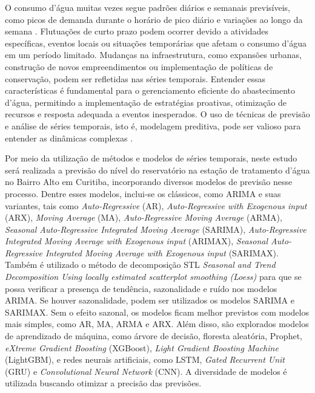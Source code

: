 O consumo d'água muitas vezes segue padrões diários e semanais previsíveis, como picos de demanda durante o horário de pico diário e variações ao longo da semana \cite{SIEGEL2020103481}. Flutuações de curto prazo podem ocorrer devido a atividades específicas, eventos locais ou situações temporárias que afetam o consumo d'água em um período limitado. Mudanças na infraestrutura, como expansões urbanas, construção de novos empreendimentos ou implementação de políticas de conservação, podem ser refletidas nas séries temporais. Entender essas características é fundamental para o gerenciamento eficiente do abastecimento d'água, permitindo a implementação de estratégias proativas, otimização de recursos e resposta adequada a eventos inesperados. O uso de técnicas de previsão e análise de séries temporais, isto é, modelagem preditiva, pode ser valioso para entender as dinâmicas complexas \cite{UCCASTILLO2023105788}.

Por meio da utilização de métodos e modelos de séries temporais, neste estudo será realizada a previsão do nível do reservatório na estação de tratamento d'água no Bairro Alto em Curitiba, incorporando diversos modelos de previsão nesse processo. Dentre esses modelos, inclui-se os clássicos, como ARIMA e suas variantes, tais como \textit{Auto-Regressive} (AR), \textit{Auto-Regressive with Exogenous input} (ARX), \textit{Moving Average} (MA), \textit{Auto-Regressive Moving Average} (ARMA), \textit{Seasonal Auto-Regressive Integrated Moving Average} (SARIMA), \textit{Auto-Regressive Integrated Moving Average with Exogenous input} (ARIMAX), \textit{Seasonal Auto-Regressive Integrated Moving Average with Exogenous input} (SARIMAX). Também é utilizado o método de decomposição STL \textit{Seasonal and Trend Decomposition Using locally estimated scatterplot smoothing (Loess)} para que se possa verificar a presença de tendência, sazonalidade e ruído nos modelos ARIMA. Se houver sazonalidade, podem ser utilizados os modelos SARIMA e SARIMAX. Sem o efeito sazonal, os modelos ficam melhor previstos com modelos mais simples, como AR, MA, ARMA e ARX. Além disso, são explorados modelos de aprendizado de máquina, como árvore de decisão, floresta aleatória, Prophet, \textit{eXtreme Gradient Boosting} (XGBoost), \textit{Light Gradient Boosting Machine} (LightGBM), e redes neurais artificiais, como LSTM, \textit{Gated Recurrent Unit} (GRU) e \textit{Convolutional Neural Network} (CNN). A diversidade de modelos é utilizada buscando otimizar a precisão das previsões.

